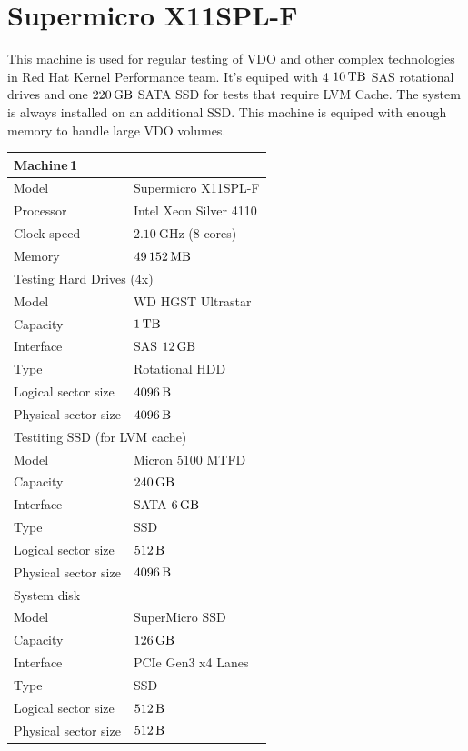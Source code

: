 \documentclass[
  color, %
  table, %
  lof,   %
  lot,   %
]{fithesis3}
\begin{document}
\section{Supermicro X11SPL-F}
This machine is used for regular testing of VDO and other complex technologies in Red Hat Kernel Performance team. It's equiped with 4 $\SI{10}{\tera\byte}$ SAS rotational drives and one $\SI{220}{\giga\byte}$ SATA SSD for tests that require LVM Cache. The system is always installed on an additional SSD. This machine is equiped with enough memory to handle large VDO volumes.
\clearpage
\begin{tabular}{|l|l|}
\hline
   \multicolumn{2}{|l|}{Machine\,1} \\ \hline %
    Model & Supermicro X11SPL-F\\
    \hline
    Processor & Intel Xeon Silver 4110  \\
    \hline
    Clock speed & $\SI{2.10}{\giga\hertz}$ (8 cores) \\
    \hline
    Memory & $\SI{49152}{\mega\byte}$ \\

\hline
   \multicolumn{2}{|l|}{Testing Hard Drives (4x)} \\ \hline %
    Model & WD HGST Ultrastar\\
    \hline
    Capacity & $\SI{1}{\tera\byte}$  \\
    \hline
    Interface & SAS $\SI{12}{\giga\byte}$  \\
    \hline
    Type & Rotational HDD \\
    \hline    
    Logical sector size & $\SI{4096}{\byte}$ \\    
    \hline    
    Physical sector size & $\SI{4096}{\byte}$ \\
    \hline
    
    \multicolumn{2}{|l|}{Testiting SSD (for LVM cache)} \\ \hline %
     Model & Micron 5100 MTFD \\
    \hline
     Capacity & $\SI{240}{\giga\byte}$  \\
    \hline
    Interface & SATA $\SI{6}{\giga\byte}$  \\
    \hline
    Type & SSD \\
    \hline    
    Logical sector size & $\SI{512}{\byte}$ \\    
    \hline    
     Physical sector size & $\SI{4096}{\byte}$ \\
    \hline
    
    \multicolumn{2}{|l|}{System disk} \\ \hline %
    Model & SuperMicro SSD  \\
    \hline
    Capacity & $\SI{126}{\giga\byte}$  \\
    \hline
    Interface & PCIe Gen3 x4 Lanes  \\
    \hline
    Type & SSD \\
    \hline    
   Logical sector size & $\SI{512}{\byte}$ \\    
    \hline    
    Physical sector size & $\SI{512}{\byte}$ \\
    \hline   
\end{tabular}
\end{document}
